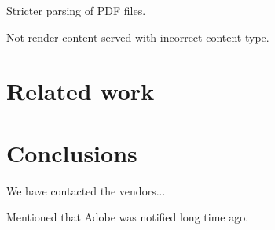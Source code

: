 \documentclass[10pt, conference, compsocconf]{IEEEtran}
\begin{document}
Stricter parsing of PDF files.

Not render content served with incorrect content type.








\section{Related work}







\section{Conclusions}


We have contacted the vendors...

Mentioned that Adobe was notified long time ago.







\end{document}

